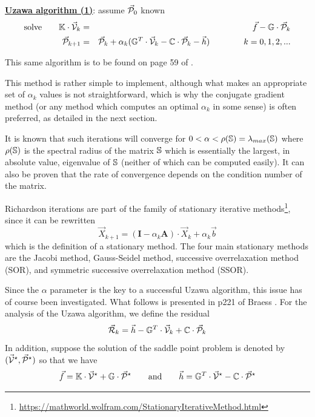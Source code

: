 \begin{mdframed}[backgroundcolor=blue!5]
\underline{\bf Uzawa algorithm (1)}: assume $\vec{\cal P}_0$ known
\begin{eqnarray}
\text{solve} \qquad \mathbb{K} \cdot \vec{\cal V}_k &=& \vec f - \mathbb{G}\cdot \vec {\cal P}_{k} \\
\vec{\cal P}_{k+1} &=& 
\vec{\cal P}_{k}  + \alpha_k (\mathbb{G}^T\cdot \vec{\cal V}_k  -{\mathbb{C}} \cdot \vec{\cal P}_{k} -\vec h)
\quad
\quad
\quad
\quad
k=0,1,2, ... \label{uzaa2}
\end{eqnarray}
\end{mdframed}
This same algorithm is to be found on page 59 of \cite{saramito}.

This method is rather simple to implement, although
what makes an appropriate set of $\alpha_k$ values is not 
straightforward, which is why the conjugate gradient method (or any method
which computes an optimal $\alpha_k$ in some sense) is often preferred, 
as detailed in the next section. 

It is known that such iterations will converge for $0< \alpha < \rho({\mathbb{S}})= \lambda_{max}({\mathbb{S}})$ 
where $\rho({\mathbb{S}})$ is the spectral radius of the matrix ${\mathbb{S}}$
which is essentially the largest, in absolute value, eigenvalue of ${\mathbb{S}}$ (neither of which 
can be computed easily).  
It can also be proven that the rate of convergence depends on the condition number of the matrix.

Richardson iterations are part of the family of stationary iterative 
methods\footnote{\url{https://mathworld.wolfram.com/StationaryIterativeMethod.html}}, 
since it can be rewritten 
\begin{equation}
{\vec X}_{k+1} = ({\bm I} - \alpha_k {\bm A} ) \cdot {\vec X}_k + \alpha_k {\vec b}
\end{equation}
which is the definition of a stationary method. 
The four main stationary methods are the Jacobi method, 
Gauss-Seidel method, successive overrelaxation method (SOR), 
and symmetric successive overrelaxation method (SSOR).

Since the $\alpha$ parameter is the key to a successful Uzawa algorithm, 
this issue has of course been investigated. What follows is 
presented in p221 of Braess \cite{braess}.
For the analysis of the Uzawa algorithm, we define the residual
\[
\vec {\cal R}_k = \vec h - \mathbb{G}^T \cdot \vec{\cal V}_k  +{\mathbb{C}} \cdot \vec{\cal P}_{k}
\]
In addition, suppose the solution of the saddle point problem is denoted
by $(\vec{\cal V}^\star,\vec{\cal P}^\star)$ so that we have
\[
\vec{f} = {\mathbb{K}} \cdot \vec{\cal V}^\star + {\mathbb{G}} \cdot \vec{\cal P}^\star
\qquad
{\rm and}
\qquad
\vec{h} = {\mathbb{G}}^T \cdot \vec{\cal V}^\star - {\mathbb{C}} \cdot \vec{\cal P}^\star 
\]


